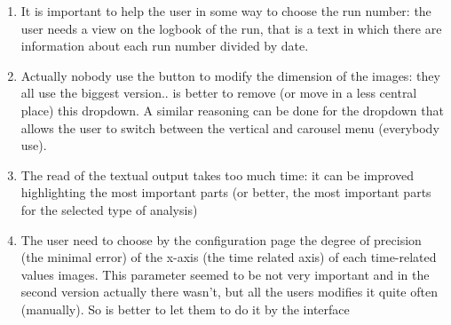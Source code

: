 \begin{enumerate}
\item 
It is important to help the user in some way to choose the run number: the user needs a view on the logbook of the run, that is a text in which there are information about each run number divided by date.

\item
Actually nobody use the button to modify the dimension of the images: they all use the biggest version.. is better to remove (or move in a less central place) this dropdown. A similar reasoning can be done for the dropdown that allows the user to switch between the vertical and carousel menu (everybody use).

\item
The read of the textual output takes too much time: it can be improved highlighting the most important parts (or better, the most important parts for the selected type of analysis)

\item
The user need to choose by the configuration page the degree of precision (the minimal error) of the x-axis (the time related axis) of each time-related values images. This parameter seemed to be not very important and in the second version actually there wasn't, but all the users modifies it quite often (manually). So is better to let them to do it by the interface

\end{enumerate}
